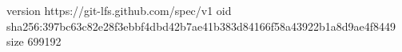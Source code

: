 version https://git-lfs.github.com/spec/v1
oid sha256:397bc63c82e28f3ebbf4dbd42b7ae41b383d84166f58a43922b1a8d9ae4f8449
size 699192
